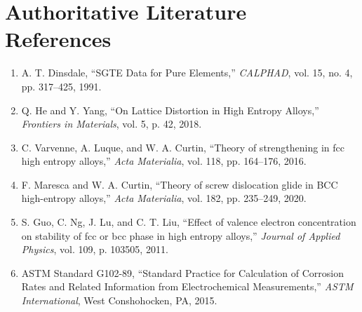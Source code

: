 \documentclass[11pt,a4paper]{article}
\begin{document}
\section*{Authoritative Literature References}
\begin{enumerate}
  \item A. T. Dinsdale, ``SGTE Data for Pure Elements,'' \textit{CALPHAD}, vol. 15, no. 4, pp. 317--425, 1991.
  \item Q. He and Y. Yang, ``On Lattice Distortion in High Entropy Alloys,'' \textit{Frontiers in Materials}, vol. 5, p. 42, 2018.
  \item C. Varvenne, A. Luque, and W. A. Curtin, ``Theory of strengthening in fcc high entropy alloys,'' \textit{Acta Materialia}, vol. 118, pp. 164--176, 2016.
  \item F. Maresca and W. A. Curtin, ``Theory of screw dislocation glide in BCC high-entropy alloys,'' \textit{Acta Materialia}, vol. 182, pp. 235--249, 2020.
  \item S. Guo, C. Ng, J. Lu, and C. T. Liu, ``Effect of valence electron concentration on stability of fcc or bcc phase in high entropy alloys,'' \textit{Journal of Applied Physics}, vol. 109, p. 103505, 2011.
  \item ASTM Standard G102-89, ``Standard Practice for Calculation of Corrosion Rates and Related Information from Electrochemical Measurements,'' \textit{ASTM International}, West Conshohocken, PA, 2015.
\end{enumerate}
\end{document}
